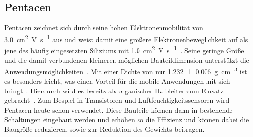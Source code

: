         \subsection{Pentacen} \label{sec:5A}
            Pentacen zeichnet sich durch seine hohen Elektronenmobilität von \SI{3.0}{\centi\meter\squared\volt\per\second} aus und weist damit eine größere Elektronenbeweglichkeit auf als jene des häufig eingesetzten Siliziums mit \SI{1.0}{\centi\meter\squared\volt\per\second}~\cite{5A_13}.
            Seine geringe Größe und die damit verbundenen kleineren möglichen Bauteildimension unterstützt die Anwendungsmöglichkeiten~\cite{IF_15}.
            Mit einer Dichte von nur \SI{1.232(6)}{\gram\per\cubic\centi\meter} ist es besonders leicht, was einen Vorteil für die mobile Anwendungen mit sich bringt~\cite{CAS}.
            Hierdurch wird es bereits als organischer Halbleiter zum Einsatz gebracht~\cite{5A_4}.
            Zum Bespiel in Transistoren \cite{5A_14, 5A_13} und Luftfeuchtigkeitssensoren \cite{demelas_chemical_2015} wird Pentacen heute schon verwendet.
            Diese Bauteile können dann in bestehende Schaltungen eingebaut werden und erhöhen so die Effizienz und können dabei die Baugröße reduzieren, sowie zur Reduktion des Gewichts beitragen.
  
